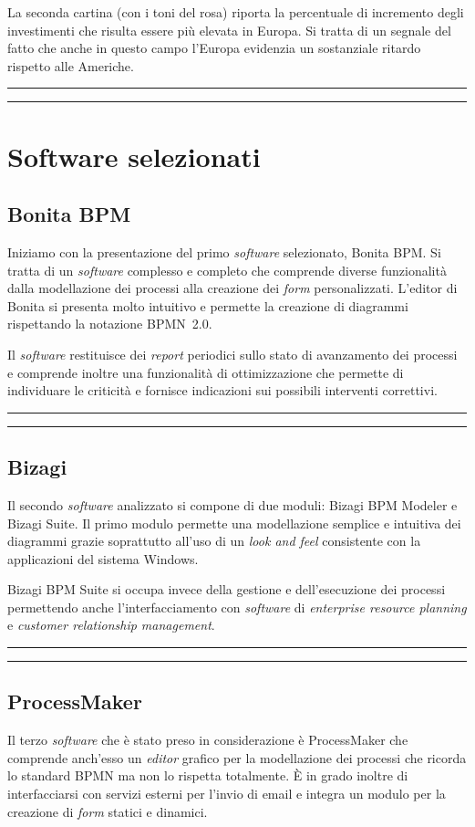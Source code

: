 \documentclass[a4paper,10pt]{article}
\newcommand{\inglese}[1]{\foreignlanguage{english}{\textit{#1}}}
\newcommand{\sw}{\inglese{software}\xspace}
\newcommand{\cambioslide}{%
\begin{center}
\Large
\rule[4pt]{0.2\linewidth}{.7pt} \ding{167} \rule[4pt]{0.2\linewidth}{.7pt}
\end{center}
}
\newcommand{\die}{%
\begin{center}
\fbox{$\mathcal{DIEGO}$}
\end{center}
}
\newcommand{\ele}{%
\begin{center}
\fbox{$\mathcal{ELENA}$}
\end{center}
}
\begin{document}
La seconda cartina (con i toni del rosa) riporta la percentuale di incremento degli investimenti che risulta essere più elevata in Europa. Si tratta di un segnale del fatto che anche in questo campo l'Europa evidenzia un sostanziale ritardo rispetto alle Americhe.

\cambioslide

\clearpage
\ele

\section{Software selezionati}

\subsection{Bonita BPM}
Iniziamo con la presentazione del primo \sw selezionato, Bonita BPM. Si tratta di un \sw complesso e completo che comprende diverse funzionalità dalla modellazione dei processi alla creazione dei \inglese{form} personalizzati.
L'editor di Bonita si presenta molto intuitivo e permette la creazione di diagrammi rispettando la notazione BPMN~2.0.

Il \sw restituisce dei \inglese{report} periodici sullo stato di avanzamento dei processi e comprende inoltre una funzionalità di ottimizzazione che permette di individuare le criticità e fornisce indicazioni sui possibili interventi correttivi.

\cambioslide

\subsection{Bizagi}
Il secondo \sw analizzato si compone di due moduli: Bizagi BPM Modeler e Bizagi Suite. Il primo modulo permette una modellazione semplice e intuitiva dei diagrammi grazie soprattutto all'uso di un \inglese{look and feel} consistente con la applicazioni del sistema Windows.

Bizagi BPM Suite si occupa invece della gestione e dell'esecuzione dei processi permettendo anche l'interfacciamento con \sw di \inglese{enterprise resource planning} e \inglese{customer relationship management}.

\cambioslide

\die

\subsection{ProcessMaker}
Il terzo \sw che è stato preso in considerazione è ProcessMaker che comprende anch'esso un \inglese{editor} grafico per la modellazione dei processi che ricorda lo standard BPMN ma non lo rispetta totalmente. È in grado inoltre di interfacciarsi con servizi esterni per l'invio di email e integra un modulo per la creazione di \inglese{form} statici e dinamici.
\end{document}
